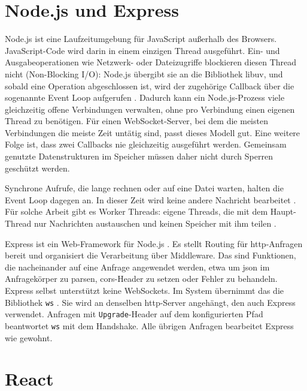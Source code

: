 \section{Node.js und Express}
\label{sec:express}

Node.js ist eine Laufzeitumgebung für JavaScript außerhalb des Browsers. JavaScript-Code wird darin in einem einzigen Thread ausgeführt. Ein- und Ausgabeoperationen wie Netzwerk- oder Dateizugriffe blockieren diesen Thread nicht (Non-Blocking I/O): Node.js übergibt sie an die Bibliothek libuv, und sobald eine Operation abgeschlossen ist, wird der zugehörige Callback über die sogenannte Event Loop aufgerufen . Dadurch kann ein Node.js-Prozess viele gleichzeitig offene Verbindungen verwalten, ohne pro Verbindung einen eigenen Thread zu benötigen. Für einen WebSocket-Server, bei dem die meisten Verbindungen die meiste Zeit untätig sind, passt dieses Modell gut. Eine weitere Folge ist, dass zwei Callbacks nie gleichzeitig ausgeführt werden. Gemeinsam genutzte Datenstrukturen im Speicher müssen daher nicht durch Sperren geschützt werden.

Synchrone Aufrufe, die lange rechnen oder auf eine Datei warten, halten die Event Loop dagegen an. In dieser Zeit wird keine andere Nachricht bearbeitet . Für solche Arbeit gibt es Worker Threads: eigene Threads, die mit dem Haupt-Thread nur Nachrichten austauschen und keinen Speicher mit ihm teilen .

Express ist ein Web-Framework für Node.js . Es stellt Routing für \gls{http}-Anfragen bereit und organisiert die Verarbeitung über Middleware. Das sind Funktionen, die nacheinander auf eine Anfrage angewendet werden, etwa um \gls{json} im Anfragekörper zu parsen, \gls{cors}-Header zu setzen oder Fehler zu behandeln. Express selbst unterstützt keine WebSockets. Im System übernimmt das die Bibliothek \texttt{ws} . Sie wird an denselben \gls{http}-Server angehängt, den auch Express verwendet. Anfragen mit \texttt{Upgrade}-Header auf dem konfigurierten Pfad beantwortet \texttt{ws} mit dem Handshake. Alle übrigen Anfragen bearbeitet Express wie gewohnt.

\section{React}
\label{sec:react}

